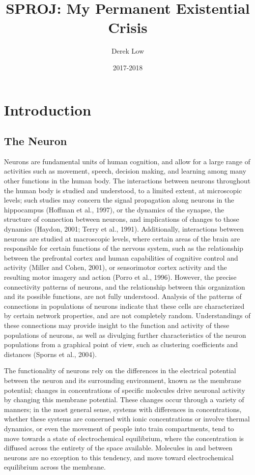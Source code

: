 \documentclass{article}
\title{SPROJ: My Permanent Existential Crisis}
\author{Derek Low}
\date{2017-2018}
\begin{document}
\maketitle

\section{Introduction}

\subsection{The Neuron}
Neurons are fundamental units of human cognition, and allow for a large range of activities such as movement, speech, decision making, and learning among many other functions in the human body. The interactions between neurons throughout the human body is studied and understood, to a limited extent, at microscopic levels; such studies may concern the signal propagation along neurons in the hippocampus (Hoffman et al., 1997), or the dynamics of the synapse, the structure of connection between neurons, and implications of changes to those dynamics (Haydon, 2001; Terry et al., 1991). Additionally, interactions between neurons are studied at macroscopic levels, where certain areas of the brain are responsible for certain functions of the nervous system, such as the relationship between the prefrontal cortex and human capabilities of cognitive control and activity (Miller and Cohen, 2001), or sensorimotor cortex activity and the resulting motor imagery and action (Porro et al., 1996). However, the precise connectivity patterns of neurons, and the relationship between this organization and its possible functions, are not fully understood. Analysis of the patterns of connections in populations of neurons indicate that these cells are characterized by certain network properties, and are not completely random. Understandings of these connections may provide insight to the function and activity of these populations of neurons, as well as divulging further characteristics of the neuron populations from a graphical point of view, such as clustering coefficients and distances (Sporns et al., 2004). \par

The functionality of neurons rely on the differences in the electrical potential between the neuron and its surrounding environment, known as the membrane potential; changes in concentrations of specific molecules drive neuronal activity by changing this membrane potential. These changes occur through a variety of manners; in the most general sense, systems with differences in concentrations, whether these systems are concerned with ionic concentrations or involve thermal dynamics, or even the movement of people into train compartments, tend to move towards a state of electrochemical equilibrium, where the concentration is diffused across the entirety of the space available. Molecules in and between neurons are no exception to this tendency, and move toward electrochemical equilibrium across the membrane.\par
\end{document}
